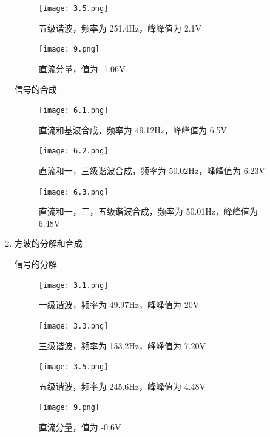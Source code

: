 \documentclass[dvipsnames, svgnames,a4paper,11pt]{article}
\begin{document}
\begin{enumerate}
\begin{figure}[htbp]
      \begin{minipage}[t]{0.48\textwidth}
      \centering
      \texttt{[image: 3.5.png]}
      \caption{五级谐波，频率为 251.4Hz，峰峰值为 2.1V}
      \end{minipage}
      \begin{minipage}[t]{0.48\textwidth}
      \centering
      \texttt{[image: 9.png]}
      \caption{直流分量，值为 -1.06V}
      \end{minipage}
    \end{figure}

    \newpage
    信号的合成
    \begin{figure}[htbp]
      \centering
      \begin{minipage}[t]{0.48\textwidth}
      \centering
      \texttt{[image: 6.1.png]}
      \caption{直流和基波合成，频率为 49.12Hz，峰峰值为 6.5V}
      \end{minipage}
      
      \begin{minipage}[t]{0.48\textwidth}
      \centering
      \texttt{[image: 6.2.png]}
      \caption{直流和一，三级谐波合成，频率为 50.02Hz，峰峰值为 6.23V}
      \end{minipage}

      \begin{minipage}[t]{0.48\textwidth}
      \centering
      \texttt{[image: 6.3.png]}
      \caption{直流和一，三，五级谐波合成，频率为 50.01Hz，峰峰值为 6.48V}
      \end{minipage}
    \end{figure}
    

  \newpage
  \item 方波的分解和合成
    
    信号的分解
    \begin{figure}[htbp]
      \centering
      \begin{minipage}[t]{0.48\textwidth}
      \centering
      \texttt{[image: 3.1.png]}
      \caption{一级谐波，频率为 49.97Hz，峰峰值为 20V}
      \end{minipage}
      \begin{minipage}[t]{0.48\textwidth}
      \centering
      \texttt{[image: 3.3.png]}
      \caption{三级谐波，频率为 153.2Hz，峰峰值为 7.20V}
      \end{minipage}

      \begin{minipage}[t]{0.48\textwidth}
      \centering
      \texttt{[image: 3.5.png]}
      \caption{五级谐波，频率为 245.6Hz，峰峰值为 4.48V}
      \end{minipage}
      \begin{minipage}[t]{0.48\textwidth}
      \centering
      \texttt{[image: 9.png]}
      \caption{直流分量，值为 -0.6V}
      \end{minipage}
    \end{figure}


\end{enumerate}
\end{document}
